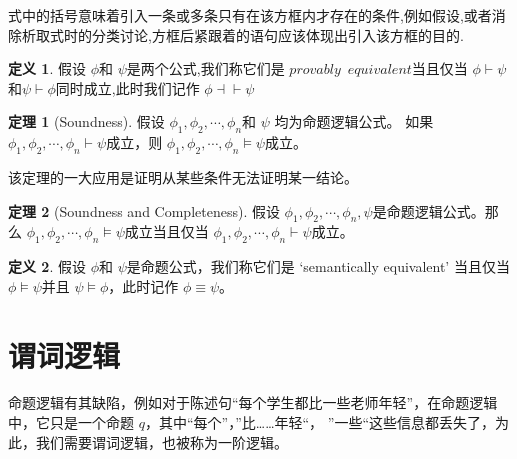 \documentclass[a4paper,11pt]{article}%
\theoremstyle{remark}
\theoremstyle{remark}
\theoremstyle{definition}
\newtheorem{theorem}{定理}[section]
\theoremstyle{definition}
\newtheorem*{definition}{定义}
\theoremstyle{plain}
\begin{document}
式中的括号意味着引入一条或多条只有在该方框内才存在的条件,例如假设,或者消除析取式时的分类讨论,方框后紧跟着的语句应该体现出引入该方框的目的.
\begin{definition}
    假设 $\phi$和 $\psi$是两个公式,我们称它们是 $provably\phantom{1}equivalent$当且仅当 $\phi\vdash\psi$和$\psi\vdash\phi$同时成立,此时我们记作
    $\phi\dashv \vdash\psi $
\end{definition}
\begin{theorem}[Soundness]
   假设 $\phi_1,\phi_2,\cdots,\phi_n$和 $\psi$ 均为命题逻辑公式。
   如果 $\phi_1,\phi_2,\cdots,\phi_n\vdash \psi$成立，则 $\phi_1,\phi_2,\cdots,\phi_n\models \psi$成立。
\end{theorem}
该定理的一大应用是证明从某些条件无法证明某一结论。
\begin{theorem}[Soundness and Completeness]
   假设 $\phi_1,\phi_2,\cdots,\phi_n,\psi$是命题逻辑公式。那么
   $\phi_1,\phi_2,\cdots,\phi_n\models \psi$成立当且仅当 $\phi_1,\phi_2,\cdots,\phi_n\vdash \psi$成立。
\end{theorem}
\begin{definition}
    假设 $\phi$和 $\psi$是命题公式，我们称它们是 `semantically equivalent'
    当且仅当 $\phi\models \psi$并且 $\psi\models\phi$，此时记作 $\phi\equiv\psi$。
\end{definition}
\section{谓词逻辑}
命题逻辑有其缺陷，例如对于陈述句“每个学生都比一些老师年轻”，在命题逻辑中，它只是一个命题 $q$，其中“每个”，”比……年轻“，
”一些“这些信息都丢失了，为此，我们需要谓词逻辑，也被称为一阶逻辑。
\end{document}
